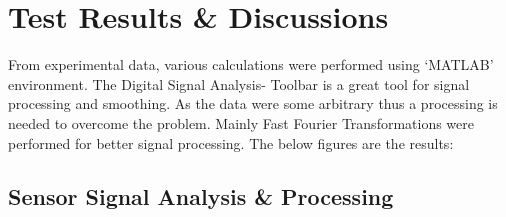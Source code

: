 \chapter{\textbf{Test Results \& Discussions}}
\begin{justify}
From experimental data, various calculations were performed using ‘MATLAB’ environment. The Digital Signal Analysis- Toolbar is a great tool for signal processing and smoothing. As the data were some arbitrary thus a processing is needed to overcome the problem. Mainly Fast Fourier Transformations were performed for better signal processing. The below figures are the results:
\end{justify}
\section{Sensor Signal Analysis \& Processing}

